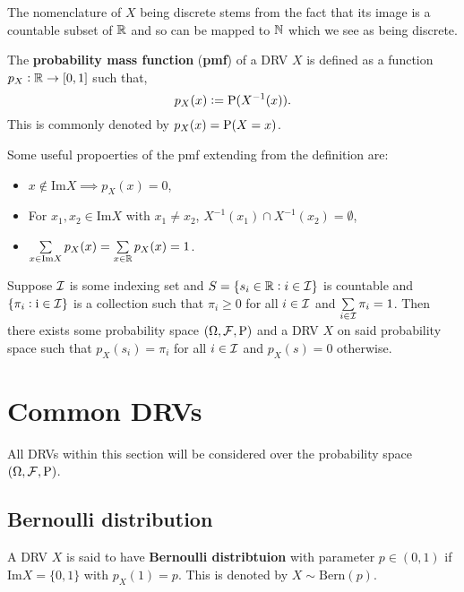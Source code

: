 \begin{remark}
    The nomenclature of $X$ being discrete stems from the fact that its image is a countable subset of $\RR$ and so can be mapped to $\NN$ which we see as being discrete.
\end{remark}

\begin{definition}
    The \textbf{probability mass function} (\textbf{pmf}) of a DRV $X$ is defined as a function $p_X: \RR \rightarrow [0,1]$ such that, \[
        p_X(x) := \P(X^{-1}(x))\textcolor{black}{.}
    \]
    This is commonly denoted by $p_X(x) = \P(X=x)$.
\end{definition}

\begin{remark}
    Some useful propoerties of the pmf extending from the definition are:
    \begin{itemize}
        \item $x \not\in \text{Im}X \implies p_X(x) = 0$,
        \item For $x_1, x_2 \in \text{Im}X$ with $x_1 \neq x_2$, $X^{-1}(x_1) \cap X^{-1}(x_2) = \emptyset$,
        \item $\sum\limits_{x\in\text{Im}X}p_X(x) = \sum\limits_{x\in\RR}p_X(x) = 1$.
    \end{itemize}
\end{remark}

\begin{theorem}
    Suppose $\III$ is some indexing set and $S = \{s_i \in \RR: i\in\III\}$ is countable and $\{\pi_i:\i \in \III\}$ is a collection such that $\pi_i \geq 0$ for all $i \in \III$ and $\sum\limits_{i\in\III}\pi_i = 1$. Then there exists some probability space $(\Omega,\FFF,\P)$ and a DRV $X$ on said probability space such that $p_X(s_i)=\pi_i$ for all $i\in\III$ and $p_X(s)=0$ otherwise.
\end{theorem}

\section{Common DRVs}
All DRVs within this section will be considered over the probability space $(\Omega, \FFF, \P)$.
\subsection{Bernoulli distribution}
\begin{definition}
    A DRV $X$ is said to have \textbf{Bernoulli distribtuion} with parameter $p\in(0,1)$ if $\text{Im}X = \{0,1\}$ with $p_X(1)=p$. This is denoted by $X \sim \text{Bern}(p)$.
\end{definition}


